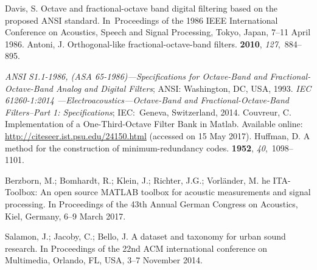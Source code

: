 \documentclass[sensors,article,accept,moreauthors,pdftex,10pt,a4paper]{mdpi}
\begin{document}
\begin{thebibliography}{999}
Davis, S.
\newblock Octave and fractional-octave band digital filtering based on the
  proposed ANSI standard.
\newblock  In~Proceedings of the 1986 IEEE International Conference on Acoustics, Speech and Signal
  Processing, {Tokyo, Japan, 7--11 April } 1986.
Antoni, J.
\newblock Orthogonal-like fractional-octave-band filters.
 {\bf 2010}, {\em 127},~884--895.

\emph{ANSI S1.1-1986, (ASA 65-1986)---Specifications for Octave-Band and
  Fractional-Octave-Band Analog and Digital Filters}; {ANSI: Washington, DC, USA,}  1993.
\emph{IEC 61260-1:2014 ---Electroacoustics---Octave-Band and Fractional-Octave-Band
  Filters--Part 1: Specifications}; {IEC:~Geneva, Switzerland, }2014.
Couvreur, C.
\newblock Implementation of a One-Third-Octave Filter Bank in Matlab.
\newblock Available online: \mbox{\url{http://citeseer.ist.psu.edu/24150.html}} ({accessed on} {15 May 2017}).
Huffman, D.
\newblock A method for the construction of minimum-redundancy codes.
 {\bf 1952}, {\em 40},~1098--1101.

Berzborn, M.; Bomhardt, R.; Klein, J.; Richter, J.G.; Vorländer, M.
he {ITA}-{T}oolbox: {A}n {o}pen {s}ource {MATLAB} {t}oolbox for
  {a}coustic {m}easurements and {s}ignal {p}rocessing.
\newblock In Proceedings of the 43th Annual German Congress on Acoustics, Kiel, Germany, 6--9 March 2017.

Salamon, J.; Jacoby, C.; Bello, J.
\newblock A dataset and taxonomy for urban sound research.
\newblock In Proceedings of the 22nd ACM international conference on Multimedia, {Orlando, FL, USA, 3--7 November }2014.


\end{thebibliography}
\end{document}
